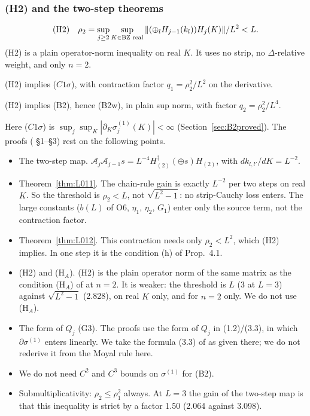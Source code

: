 \subsubsection{(H2) and the two-step theorems}\label{sec:twostep}
\[
\text{(H2)}\quad\rho_2=\sup_{j\ge2}\sup_{K\in\mathrm{BZ}\text{ real}}\|(\oplus_lH_{j-1}(k_l))H_j(K)\|/L^2<L.
\]
(H2) is a plain operator-norm inequality on real $K$. It uses no strip, no $\Delta$-relative weight, and only $n=2$.
\begin{theorem}[L-011]\label{thm:L011}
(H2) implies ($C1\sigma$), with contraction factor $q_1=\rho_2^2/L^2$ on the derivative.
\end{theorem}
\begin{theorem}[L-012]\label{thm:L012}
(H2) implies (B2), hence (B2w), in plain sup norm, with factor $q_2=\rho_2^2/L^4$.
\end{theorem}
Here ($C1\sigma$) is $\sup_j\sup_K|\partial_K\sigma_j^{(1)}(K)|<\infty$ (Section~\ref{sec:B2proved}). The proofs ( \S1--\S3) rest on the following points.
\begin{itemize}
\item The two-step map. $\mathcal A_j\mathcal A_{j-1}s=L^{-4}H_{(2)}^\dagger(\oplus s)H_{(2)}$, with $dk_{l,l'}/dK=L^{-2}$.
\item Theorem~\ref{thm:L011}. The chain-rule gain is exactly $L^{-2}$ per two steps on real $K$. So the threshold is $\rho_2<L$, not $\sqrt{L^2-1}$: no strip-Cauchy loss enters. The large constants ($b(L)$ of O6, $\eta_1$, $\eta_2$, $G_1$) enter only the source term, not the contraction factor.
\item Theorem~\ref{thm:L012}. This contraction needs only $\rho_2<L^2$, which (H2) implies. In one step it is the condition (h) of Prop.\ 4.1.
\item (H2) and (H$_A$). (H2) is the plain operator norm of the same matrix as the condition (H$_A$) of  at $n=2$. It is weaker: the threshold is $L$ (3 at $L=3$) against $\sqrt{L^2-1}$ (2.828), on real $K$ only, and for $n=2$ only. We do not use (H$_A$).
\item The form of $Q_j$ (G3). The proofs use the form of $Q_j$ in  (1.2)/(3.3), in which $\partial\sigma^{(1)}$ enters linearly. We take the formula (3.3) of  as given there; we do not rederive it from the Moyal rule here.
\item We do not need $C^2$ and $C^3$ bounds on $\sigma^{(1)}$ for (B2).
\item Submultiplicativity: $\rho_2\le\rho_1^2$ always. At $L=3$ the gain of the two-step map is that this inequality is strict by a factor 1.50 (2.064 against 3.098).
\end{itemize}

